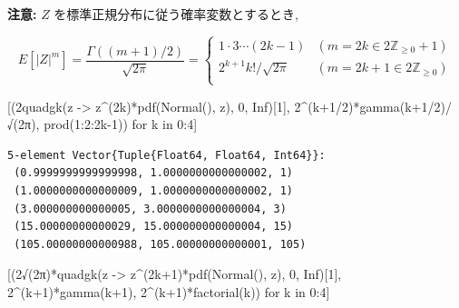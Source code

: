 \documentclass[
  letterpaper,
  DIV=11,
  numbers=noendperiod]{scrartcl}
\newenvironment{Shaded}{\begin{snugshade}}{\end{snugshade}}
\newcommand{\ConstantTok}[1]{\textcolor[rgb]{0.56,0.35,0.01}{#1}}
\newcommand{\FloatTok}[1]{\textcolor[rgb]{0.68,0.00,0.00}{#1}}
\newcommand{\FunctionTok}[1]{\textcolor[rgb]{0.28,0.35,0.67}{#1}}
\newcommand{\KeywordTok}[1]{\textcolor[rgb]{0.00,0.23,0.31}{#1}}
\newcommand{\NormalTok}[1]{\textcolor[rgb]{0.00,0.23,0.31}{#1}}
\newcommand{\OperatorTok}[1]{\textcolor[rgb]{0.37,0.37,0.37}{#1}}
\begin{document}
\textbf{注意:} \(Z\) を標準正規分布に従う確率変数とするとき,

\[
E[|Z|^m] =
\frac{\Gamma((m+1)/2)}{\sqrt{2\pi}} =
\begin{cases}
1\cdot 3\cdots (2k-1)    & (m = 2k \in 2{\mathbb Z}_{\ge 0}+1) \\
2^{k+1} k! \big/ \sqrt{2\pi} & (m = 2k+1 \in 2{\mathbb Z}_{\ge 0}) \\
\end{cases}
\]

\begin{Shaded}
\begin{Highlighting}[]
\NormalTok{[(}\FloatTok{2}\FunctionTok{quadgk}\NormalTok{(z }\OperatorTok{{-}\textgreater{}}\NormalTok{ z}\OperatorTok{\^{}}\NormalTok{(}\FloatTok{2}\NormalTok{k)}\FunctionTok{*pdf}\NormalTok{(}\FunctionTok{Normal}\NormalTok{(), z), }\FloatTok{0}\NormalTok{, }\ConstantTok{Inf}\NormalTok{)[}\FloatTok{1}\NormalTok{],}
        \FloatTok{2}\OperatorTok{\^{}}\NormalTok{(k}\OperatorTok{+}\FloatTok{1}\OperatorTok{/}\FloatTok{2}\NormalTok{)}\FunctionTok{*gamma}\NormalTok{(k}\OperatorTok{+}\FloatTok{1}\OperatorTok{/}\FloatTok{2}\NormalTok{)}\OperatorTok{/}\FunctionTok{√}\NormalTok{(}\FloatTok{2}\NormalTok{π), }\FunctionTok{prod}\NormalTok{(}\FloatTok{1}\OperatorTok{:}\FloatTok{2}\OperatorTok{:}\FloatTok{2}\NormalTok{k}\OperatorTok{{-}}\FloatTok{1}\NormalTok{)) for k }\KeywordTok{in} \FloatTok{0}\OperatorTok{:}\FloatTok{4}\NormalTok{]}
\end{Highlighting}
\end{Shaded}

\begin{verbatim}
5-element Vector{Tuple{Float64, Float64, Int64}}:
 (0.9999999999999998, 1.0000000000000002, 1)
 (1.0000000000000009, 1.0000000000000002, 1)
 (3.000000000000005, 3.0000000000000004, 3)
 (15.00000000000029, 15.000000000000004, 15)
 (105.00000000000988, 105.00000000000001, 105)
\end{verbatim}

\begin{Shaded}
\begin{Highlighting}[]
\NormalTok{[(}\FloatTok{2}\FunctionTok{√}\NormalTok{(}\FloatTok{2}\NormalTok{π)}\FunctionTok{*quadgk}\NormalTok{(z }\OperatorTok{{-}\textgreater{}}\NormalTok{ z}\OperatorTok{\^{}}\NormalTok{(}\FloatTok{2}\NormalTok{k}\OperatorTok{+}\FloatTok{1}\NormalTok{)}\FunctionTok{*pdf}\NormalTok{(}\FunctionTok{Normal}\NormalTok{(), z), }\FloatTok{0}\NormalTok{, }\ConstantTok{Inf}\NormalTok{)[}\FloatTok{1}\NormalTok{],}
        \FloatTok{2}\OperatorTok{\^{}}\NormalTok{(k}\OperatorTok{+}\FloatTok{1}\NormalTok{)}\FunctionTok{*gamma}\NormalTok{(k}\OperatorTok{+}\FloatTok{1}\NormalTok{), }\FloatTok{2}\OperatorTok{\^{}}\NormalTok{(k}\OperatorTok{+}\FloatTok{1}\NormalTok{)}\FunctionTok{*factorial}\NormalTok{(k)) for k }\KeywordTok{in} \FloatTok{0}\OperatorTok{:}\FloatTok{4}\NormalTok{]}
\end{Highlighting}
\end{Shaded}
\end{document}
